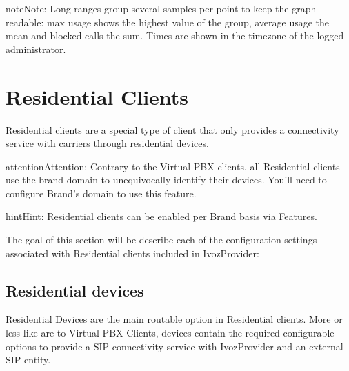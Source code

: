 \documentclass[letterpaper,10pt,english]{sphinxmanual}
\begin{document}
\begin{notice}{note}{Note:}
Long ranges group several samples per point to keep the graph readable: max usage shows the highest value
of the group, average usage the mean and blocked calls the sum. Times are shown in the timezone of the
logged administrator.
\end{notice}
\label{administration_portal/client/residential/index:residential-clients}

\section{Residential Clients}
\label{administration_portal/client/residential/index:residential-clients}\label{administration_portal/client/residential/index:id1}\label{administration_portal/client/residential/index::doc}\label{administration_portal/client/residential/index:clientes-residenciales}
Residential clients are a special type of client that only provides a connectivity
service with carriers through residential devices.

\begin{notice}{attention}{Attention:}
Contrary to the Virtual PBX clients, all Residential clients use the
brand domain to unequivocally identify their devices. You'll need to configure
Brand's domain to use this feature.
\end{notice}

\begin{notice}{hint}{Hint:}
Residential clients can be enabled per Brand basis via Features.
\end{notice}

The goal of this section will be describe each of the configuration settings
associated with Residential clients included in IvozProvider:


\subsection{Residential devices}
\label{administration_portal/client/residential/residential_devices:id1}\label{administration_portal/client/residential/residential_devices::doc}\label{administration_portal/client/residential/residential_devices:residential-devices}
Residential Devices are the main routable option in Residential clients.
More or less like {\hyperref[administration_portal/client/vpbx/routing_endpoints/friends/index:friends]{}} are to Virtual PBX Clients, devices
contain the required configurable options to provide a SIP connectivity
service with IvozProvider and an external SIP entity.
\end{document}
